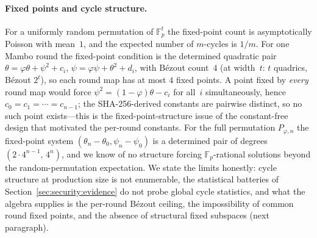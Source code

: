 \documentclass[11pt,a4paper]{article}
\theoremstyle{definition}
\newcommand{\Fp}{\mathbb{F}_p}
\begin{document}
\paragraph{Fixed points and cycle structure.}
For a uniformly random permutation of $\Fp^t$ the fixed-point count
is asymptotically Poisson with mean~$1$, and the expected number of
$m$-cycles is $1/m$. For one Mambo round the fixed-point condition is
the determined quadratic pair
$\theta = \varphi\theta + \psi^2 + c_i$,
$\psi = \varphi\psi + \theta^2 + d_i$,
with B\'ezout count~$4$ (at width~$t$: $t$ quadrics, B\'ezout
$2^t$), so each round map has at most $4$ fixed points. A point
fixed by \emph{every} round map would force
$\psi^2 = (1-\varphi)\theta - c_i$ for all~$i$ simultaneously, hence
$c_0 = c_1 = \cdots = c_{n-1}$; the SHA-256-derived constants are
pairwise distinct, so no such point exists---this is the
fixed-point-structure issue of the constant-free design that
motivated the per-round constants. For the full permutation
$P_{\varphi,n}$ the fixed-point system
$(\theta_n - \theta_0, \psi_n - \psi_0)$ is a determined pair of
degrees $(2 \cdot 4^{n-1},\, 4^n)$, and we know of no structure
forcing $\Fp$-rational solutions beyond the random-permutation
expectation. We state the limits honestly: cycle structure at
production size is not enumerable, the statistical batteries of
Section~\ref{sec:security:evidence} do not probe global cycle
statistics, and what the algebra supplies is the per-round B\'ezout
ceiling, the impossibility of common round fixed points, and the
absence of structural fixed subspaces (next paragraph).
\end{document}
